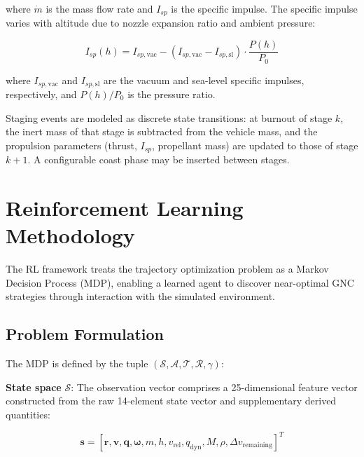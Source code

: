 \documentclass[conference]{IEEEtran}
\newcommand{\vect}[1]{\boldsymbol{#1}}
\begin{document}
\noindent where $\dot{m}$ is the mass flow rate and $I_{sp}$ is the specific impulse. The specific impulse varies with altitude due to nozzle expansion ratio and ambient pressure:

\begin{equation}
    I_{sp}(h) = I_{sp,\text{vac}} - (I_{sp,\text{vac}} - I_{sp,\text{sl}}) \cdot \frac{P(h)}{P_0}
    \label{eq:isp_altitude}
\end{equation}

\noindent where $I_{sp,\text{vac}}$ and $I_{sp,\text{sl}}$ are the vacuum and sea-level specific impulses, respectively, and $P(h)/P_0$ is the pressure ratio.

Staging events are modeled as discrete state transitions: at burnout of stage $k$, the inert mass of that stage is subtracted from the vehicle mass, and the propulsion parameters (thrust, $I_{sp}$, propellant mass) are updated to those of stage $k+1$. A configurable coast phase may be inserted between stages.

\section{Reinforcement Learning Methodology}

The RL framework treats the trajectory optimization problem as a Markov Decision Process (MDP), enabling a learned agent to discover near-optimal GNC strategies through interaction with the simulated environment.

\subsection{Problem Formulation}

The MDP is defined by the tuple $(\mathcal{S}, \mathcal{A}, \mathcal{T}, \mathcal{R}, \gamma)$:

\textbf{State space} $\mathcal{S}$: The observation vector comprises a 25-dimensional feature vector constructed from the raw 14-element state vector and supplementary derived quantities:

\begin{equation}
    \vect{s} = [\vect{r}, \vect{v}, \vect{q}, \vect{\omega}, m, h, v_{\text{rel}}, q_{\text{dyn}}, M, \rho, \Delta v_{\text{remaining}}]^T
    \label{eq:state_space}
\end{equation}
\end{document}
